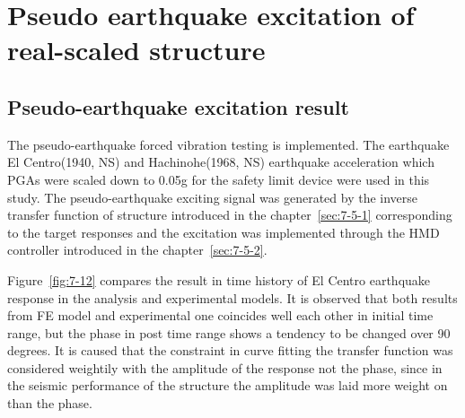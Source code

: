 \section{Pseudo earthquake excitation of real-scaled structure}
\subsection{Pseudo-earthquake excitation result}
The pseudo-earthquake forced vibration testing is implemented. The earthquake El Centro(1940, NS) and Hachinohe(1968, NS) earthquake acceleration which PGAs were scaled down to 0.05g for the safety limit device were used in this study. The pseudo-earthquake exciting signal was generated by the inverse transfer function of structure introduced in the chapter~\ref{sec:7-5-1} corresponding to the target responses and the excitation was implemented through the HMD controller introduced in the chapter~\ref{sec:7-5-2}.

Figure~\ref{fig:7-12} compares the result in time history of El Centro earthquake response in the analysis and experimental models. It is observed that both results from FE model and experimental one coincides well each other in initial time range, but the phase in post time range shows a tendency to be changed over 90 degrees. It is caused that the constraint in curve fitting the transfer function was considered weightily with the amplitude of the response not the phase, since in the seismic performance of the structure the amplitude was laid more weight on than the phase.

